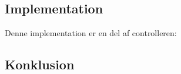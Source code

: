 \subsection{Implementation}
Denne implementation er en del af controlleren: 

\subsection{Konklusion}


